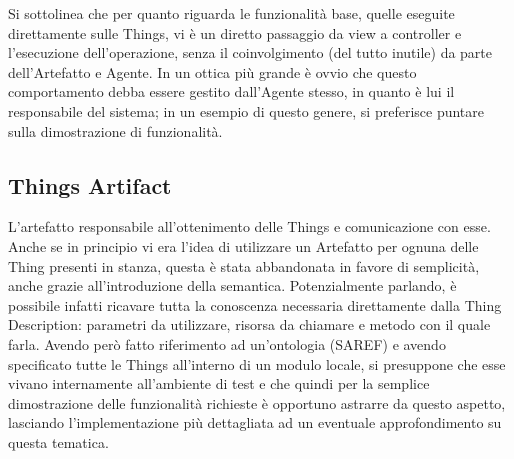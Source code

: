 \documentclass[12pt,a4paper,openright,oneside]{report}
\begin{document}
Si sottolinea che per quanto riguarda le funzionalità base, quelle eseguite direttamente sulle Things, vi è un diretto passaggio da view a controller e l'esecuzione dell'operazione, senza il coinvolgimento (del tutto inutile) da parte dell'Artefatto e Agente. In un ottica più grande è ovvio che questo comportamento debba essere gestito dall'Agente stesso, in quanto è lui il responsabile del sistema; in un esempio di questo genere, si preferisce puntare sulla dimostrazione di funzionalità.

\subsection{Things Artifact}
\label{sec:things_artifact}
L'artefatto responsabile all'ottenimento delle Things e comunicazione con esse. Anche se in principio vi era l'idea di utilizzare un Artefatto per ognuna delle Thing presenti in stanza, questa è stata abbandonata in favore di semplicità, anche grazie all'introduzione della semantica. Potenzialmente parlando, è possibile infatti  ricavare tutta la conoscenza necessaria direttamente dalla Thing Description: parametri da utilizzare, risorsa da chiamare e metodo con il quale farla. Avendo però fatto riferimento ad un'ontologia (SAREF) e avendo specificato tutte le Things all'interno di un modulo locale, si presuppone che esse vivano internamente all'ambiente di test e che quindi per la semplice dimostrazione delle funzionalità richieste è opportuno astrarre da questo aspetto, lasciando l'implementazione più dettagliata ad un eventuale approfondimento su questa tematica.\\
\end{document}
